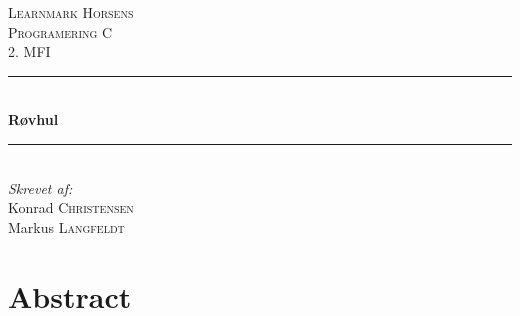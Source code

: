 \documentclass[12pt]{article}
\begin{document}
\begin{titlepage}

	\newcommand{\HRule}{\rule{\linewidth}{0.5mm}}

	\center


	\textsc{\LARGE Learnmark Horsens}\\[1.5cm] %
	\textsc{\Large Programering C}\\[0.5cm] %
	\textsc{\large 2. MFI}\\[0.5cm] %


	\HRule \\[0.4cm]
	{ \huge \bfseries R\o vhul}\\[0.4cm]
	\HRule \\[1.5cm]


	\Large \emph{Skrevet af:}\\
	Konrad \textsc{Christensen}\\
	Markus \textsc{Langfeldt}\\[3cm]

	\vfill

\end{titlepage}

\pagebreak


\tableofcontents

\vfill

\pagebreak


\section{Abstract}
\end{document}
